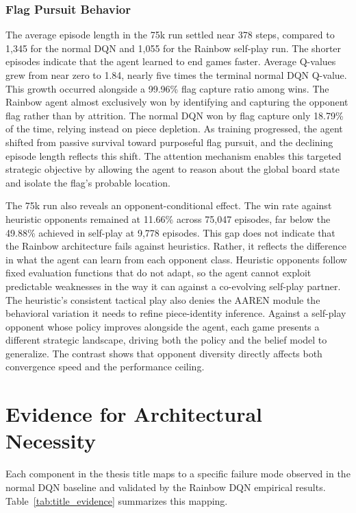 \subsubsection{Flag Pursuit Behavior}\label{finding:14}
The average episode length in the 75k run settled near 378 steps, compared to 1,345 for the normal DQN and 1,055 for the Rainbow self-play run. The shorter episodes indicate that the agent learned to end games faster. Average Q-values grew from near zero to 1.84, nearly five times the terminal normal DQN Q-value. This growth occurred alongside a 99.96\% flag capture ratio among wins. The Rainbow agent almost exclusively won by identifying and capturing the opponent flag rather than by attrition. The normal DQN won by flag capture only 18.79\% of the time, relying instead on piece depletion. As training progressed, the agent shifted from passive survival toward purposeful flag pursuit, and the declining episode length reflects this shift. The attention mechanism enables this targeted strategic objective by allowing the agent to reason about the global board state and isolate the flag's probable location.

The 75k run also reveals an opponent-conditional effect. The win rate against heuristic opponents remained at 11.66\% across 75,047 episodes, far below the 49.88\% achieved in self-play at 9,778 episodes. This gap does not indicate that the Rainbow architecture fails against heuristics. Rather, it reflects the difference in what the agent can learn from each opponent class. Heuristic opponents follow fixed evaluation functions that do not adapt, so the agent cannot exploit predictable weaknesses in the way it can against a co-evolving self-play partner. The heuristic's consistent tactical play also denies the AAREN module the behavioral variation it needs to refine piece-identity inference. Against a self-play opponent whose policy improves alongside the agent, each game presents a different strategic landscape, driving both the policy and the belief model to generalize. The contrast shows that opponent diversity directly affects both convergence speed and the performance ceiling.

\section{Evidence for Architectural Necessity}

Each component in the thesis title maps to a specific failure mode observed in the normal DQN baseline and validated by the Rainbow DQN empirical results. Table~\ref{tab:title_evidence} summarizes this mapping.

